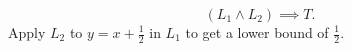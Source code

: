 \[
  (L_1 \land L_2) \implies T.
\]
Apply \(L_2\) to \(y=x+\tfrac12\) in \(L_1\) to get a lower bound of \(\tfrac12\).
